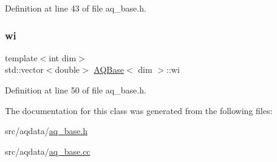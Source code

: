 Definition at line 43 of file aq\+\_\+base.\+h.

\mbox{\label{class_a_q_base_aa43b0232837b86e608da7507bd9a14b5}} 
\subsubsection{\texorpdfstring{wi}{wi}}
{\footnotesize\ttfamily template$<$int dim$>$ \\
std\+::vector$<$double$>$ \hyperlink{class_a_q_base}{A\+Q\+Base}$<$ dim $>$\+::wi\hspace{0.3cm}{\ttfamily [protected]}}



Definition at line 50 of file aq\+\_\+base.\+h.



The documentation for this class was generated from the following files\+:\begin{DoxyCompactItemize}
\item 
src/aqdata/\hyperlink{aq__base_8h}{aq\+\_\+base.\+h}\item 
src/aqdata/\hyperlink{aq__base_8cc}{aq\+\_\+base.\+cc}\end{DoxyCompactItemize}

